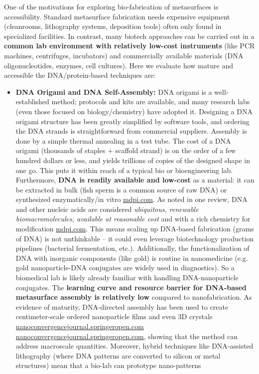 \documentclass[11pt,a4paper]{article}
\begin{document}
One of the motivations for exploring bio-fabrication of metasurfaces is accessibility. Standard metasurface fabrication needs expensive equipment (cleanrooms, lithography systems, deposition tools) often only found in specialized facilities. In contrast, many biotech approaches can be carried out in a \textbf{common lab environment with relatively low-cost instruments} (like PCR machines, centrifuges, incubators) and commercially available materials (DNA oligonucleotides, enzymes, cell cultures). Here we evaluate how mature and accessible the DNA/protein-based techniques are:

\begin{itemize}
  \item \textbf{DNA Origami and DNA Self-Assembly:} DNA origami is a well-established method; protocols and kits are available, and many research labs (even those focused on biology/chemistry) have adopted it. Designing a DNA origami structure has been greatly simplified by software tools, and ordering the DNA strands is straightforward from commercial suppliers. Assembly is done by a simple thermal annealing in a test tube. The cost of a DNA origami (thousands of staples + scaffold strand) is on the order of a few hundred dollars or less, and yields trillions of copies of the designed shape in one go. This puts it within reach of a typical bio or bioengineering lab. Furthermore, \textbf{DNA is readily available and low-cost} as a material: it can be extracted in bulk (fish sperm is a common source of raw DNA) or synthesized enzymatically/in vitro \href{https://www.mdpi.com/2079-6374/12/11/962#:~:text=feedstocks%2C nucleic acids (e,in mammalian}{mdpi.com}. As noted in one review, DNA and other nucleic acids are considered \emph{ubiquitous, renewable biomacromolecules, available at reasonable cost} and with a rich chemistry for modification \href{https://www.mdpi.com/2079-6374/12/11/962#:~:text=feedstocks%2C nucleic acids (e,in mammalian}{mdpi.com}. This means scaling up DNA-based fabrication (grams of DNA) is not unthinkable -- it could even leverage biotechnology production pipelines (bacterial fermentation, etc.). Additionally, the functionalization of DNA with inorganic components (like gold) is routine in nanomedicine (e.g. gold nanoparticle-DNA conjugates are widely used in diagnostics). So a biomedical lab is likely already familiar with handling DNA-nanoparticle conjugates. The \textbf{learning curve and resource barrier for DNA-based metasurface assembly is relatively low} compared to nanofabrication. As evidence of maturity, DNA-directed assembly has been used to create centimeter-scale ordered nanoparticle films and even 3D crystals \href{https://nanoconvergencejournal.springeropen.com/articles/10.1186/s40580-020-00226-7#:~:text=DNA,143]. Here%2C DNA is}{nanoconvergencejournal.springeropen.com} \href{https://nanoconvergencejournal.springeropen.com/articles/10.1186/s40580-020-00226-7#:~:text=match at L939 Programmable DNA,plasmonic nanoparticle metamaterials with high}{nanoconvergencejournal.springeropen.com}, showing that the method can address macroscale quantities. Moreover, hybrid techniques like DNA-assisted lithography (where DNA patterns are converted to silicon or metal structures) mean that a bio-lab can prototype nano-patterns 
\end{itemize}
\end{document}
